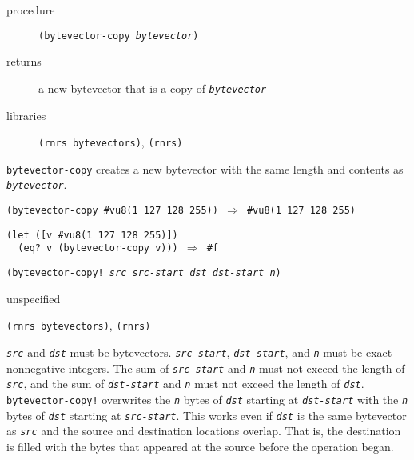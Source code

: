 \begin{description}

\label{objects_s246}\item[procedure] \texttt{(bytevector-copy \textit{bytevector})}



\item[returns] a new bytevector that is a copy of \texttt{\textit{bytevector}} 


\item[libraries] \texttt{(rnrs bytevectors)}, \texttt{(rnrs)}
\end{description}

\texttt{bytevector-copy} creates a new bytevector with the same length and
contents as \texttt{\textit{bytevector}}.

\begin{alltt}
(bytevector-copy \#{}vu8(1 127 128 255)) \(\Rightarrow\) \#{}vu8(1 127 128 255)

(let ([v \#{}vu8(1 127 128 255)])
  (eq? v (bytevector-copy v))) \(\Rightarrow\) \#{}f
\end{alltt}

\begin{description}

\label{objects_s247}\item[procedure] \texttt{(bytevector-copy! \textit{src} \textit{src-start} \textit{dst} \textit{dst-start} \textit{n})}



\item[returns] unspecified


\item[libraries] \texttt{(rnrs bytevectors)}, \texttt{(rnrs)}
\end{description}

\texttt{\textit{src}} and \texttt{\textit{dst}} must be bytevectors.
\texttt{\textit{src-start}}, \texttt{\textit{dst-start}}, and \texttt{\textit{n}} must be exact nonnegative
integers.
The sum of \texttt{\textit{src-start}} and \texttt{\textit{n}} must not exceed the length of \texttt{\textit{src}},
and the sum of \texttt{\textit{dst-start}} and \texttt{\textit{n}} must not exceed the length of \texttt{\textit{dst}}.
\texttt{bytevector-copy!} overwrites the \texttt{\textit{n}} bytes of \texttt{\textit{dst}}
starting at \texttt{\textit{dst-start}} with the \texttt{\textit{n}} bytes of \texttt{\textit{dst}}
starting at \texttt{\textit{src-start}}.
This works even if \texttt{\textit{dst}} is the same bytevector as \texttt{\textit{src}} and the
source and destination locations overlap.
That is, the destination is filled with the bytes that appeared at the
source before the operation began.

